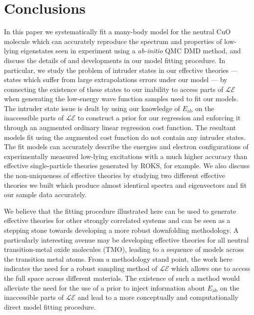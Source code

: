 \documentclass{article}
\begin{document}
\section{Conclusions}
In this paper we systematically fit a many-body model for the neutral CuO molecule which can accurately reproduce the spectrum and properties of low-lying eigenstates seen in experiment using a \textit{ab-initio} QMC DMD method, and discuss the details of and developments in our model fitting procedure.
In particular, we study the problem of intruder states in our effective theories --- states which suffer from large extrapolations errors under our model ---  by connecting the existence of these states to our inability to access parts of $\mathcal{LE}$ when generating the low-energy wave function samples used to fit our models.
The intruder state issue is dealt by using our knowledge of $E_\text{ab}$ on the inaccessible parts of $\mathcal{LE}$ to construct a prior for our regression and enforcing it through an augmented ordinary linear regression cost function.
The resultant models fit using the augmented cost function do not contain any intruder states.
The fit models can accurately describe the energies and electron configurations of experimentally measured low-lying excitations with a much higher accuracy than effective single-particle theories generated by ROKS, for example.
We also discuss the non-uniqueness of effective theories by studying two different effective theories we built which produce almost identical spectra and eigenvectors and fit our sample data accurately.

We believe that the fitting procedure illustrated here can be used to generate effective theories for other strongly correlated systems and can be seen as a stepping stone towards developing a more robust downfolding methodology. 
A particularly interesting avenue may be developing effective theories for all neutral transition-metal oxide molecules (TMO), leading to a sequence of models across the transition metal atoms. 
From a methodology stand point, the work here indicates the need for a robust sampling method of $\mathcal{LE}$ which allows one to access the full space across different materials.
The existence of such a method would alleviate the need for the use of a prior to inject information about $E_\text{ab}$ on the inaccessible parts of $\mathcal{LE}$ and lead to a more conceptually and computationally direct model fitting procedure. 
\end{document}
